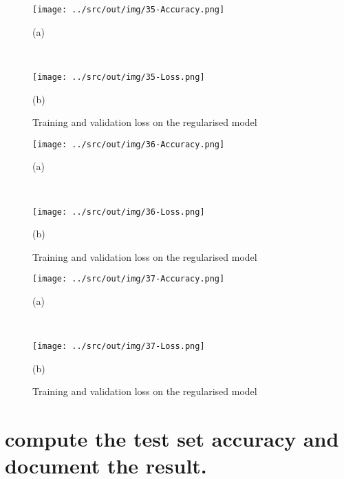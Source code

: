 \documentclass[a4paper,12pt]{article} %
\begin{document}
		
	\begin{figure}[htb]
		\begin{minipage}[c]{.49\textwidth}
			\centering
			\texttt{[image: ../src/out/img/35-Accuracy.png]}
			\caption*{(a)}
		\end{minipage}
		~
		\begin{minipage}[c]{.49\textwidth}
			\centering
			\texttt{[image: ../src/out/img/35-Loss.png]}
			\caption*{(b)}
		\end{minipage}
		\caption{Training and validation loss on the regularised model}
		\label{fig:model7-performance}
	\end{figure}
	
		
	\begin{figure}[htb]
		\begin{minipage}[c]{.49\textwidth}
			\centering
			\texttt{[image: ../src/out/img/36-Accuracy.png]}
			\caption*{(a)}
		\end{minipage}
		~
		\begin{minipage}[c]{.49\textwidth}
			\centering
			\texttt{[image: ../src/out/img/36-Loss.png]}
			\caption*{(b)}
		\end{minipage}
		\caption{Training and validation loss on the regularised model}
		\label{fig:model8-performance}
	\end{figure}
	
		
	\begin{figure}[htb]
		\begin{minipage}[c]{.49\textwidth}
			\centering
			\texttt{[image: ../src/out/img/37-Accuracy.png]}
			\caption*{(a)}
		\end{minipage}
		~
		\begin{minipage}[c]{.49\textwidth}
			\centering
			\texttt{[image: ../src/out/img/37-Loss.png]}
			\caption*{(b)}
		\end{minipage}
		\caption{Training and validation loss on the regularised model}
		\label{fig:model9-performance}
	\end{figure}


	\section{compute the test set accuracy and document the result.} 
	\label{section:finalmodel}
\end{document}
